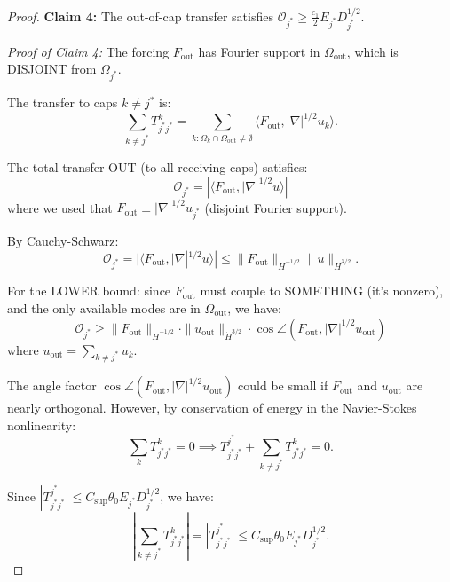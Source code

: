 \documentclass[11pt]{article}
\theoremstyle{definition}
\begin{document}
\begin{proof}
\textbf{Claim 4:} The out-of-cap transfer satisfies $\mathcal{O}_{j^*} \geq \frac{c_1}{2} E_{j^*} D_{j^*}^{1/2}$.

\textit{Proof of Claim 4:} The forcing $F_{\text{out}}$ has Fourier support in $\Omega_{\text{out}}$, which is DISJOINT from $\Omega_{j^*}$.

The transfer to caps $k \neq j^*$ is:
\begin{equation}
\sum_{k \neq j^*} T_{j^*j^*}^k = \sum_{k : \Omega_k \cap \Omega_{\text{out}} \neq \emptyset} \langle F_{\text{out}}, |\nabla|^{1/2} u_k \rangle.
\end{equation}

The total transfer OUT (to all receiving caps) satisfies:
\begin{equation}
\mathcal{O}_{j^*} = \left| \langle F_{\text{out}}, |\nabla|^{1/2} u \rangle \right|
\end{equation}
where we used that $F_{\text{out}} \perp |\nabla|^{1/2} u_{j^*}$ (disjoint Fourier support).

By Cauchy-Schwarz:
\begin{equation}
\mathcal{O}_{j^*} = |\langle F_{\text{out}}, |\nabla|^{1/2} u \rangle| \leq \|F_{\text{out}}\|_{\dot{H}^{-1/2}} \|u\|_{\dot{H}^{3/2}}.
\end{equation}

For the LOWER bound: since $F_{\text{out}}$ must couple to SOMETHING (it's nonzero), and the only available modes are in $\Omega_{\text{out}}$, we have:
\begin{equation}
\mathcal{O}_{j^*} \geq \|F_{\text{out}}\|_{\dot{H}^{-1/2}} \cdot \|u_{\text{out}}\|_{\dot{H}^{3/2}} \cdot \cos\angle(F_{\text{out}}, |\nabla|^{1/2} u_{\text{out}})
\end{equation}
where $u_{\text{out}} = \sum_{k \neq j^*} u_k$.

The angle factor $\cos\angle(F_{\text{out}}, |\nabla|^{1/2} u_{\text{out}})$ could be small if $F_{\text{out}}$ and $u_{\text{out}}$ are nearly orthogonal. However, by conservation of energy in the Navier-Stokes nonlinearity:
\begin{equation}
\sum_k T_{j^*j^*}^k = 0 \implies T_{j^*j^*}^{j^*} + \sum_{k \neq j^*} T_{j^*j^*}^k = 0.
\end{equation}

Since $|T_{j^*j^*}^{j^*}| \leq C_{\text{sup}}\theta_0 E_{j^*} D_{j^*}^{1/2}$, we have:
\begin{equation}
\left|\sum_{k \neq j^*} T_{j^*j^*}^k\right| = |T_{j^*j^*}^{j^*}| \leq C_{\text{sup}}\theta_0 E_{j^*} D_{j^*}^{1/2}.
\end{equation}


\end{proof}
\end{document}
